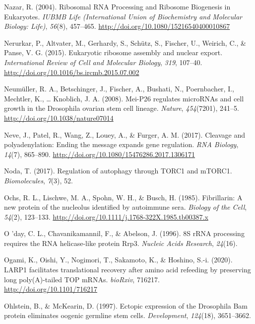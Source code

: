 \documentclass[12pt,twoside]{reedthesis}
\newlength{\cslhangindent}
\newenvironment{cslreferences}%
  {\setlength{\parindent}{0pt}%
  \everypar{\setlength{\hangindent}{\cslhangindent}}\ignorespaces}%
  {\par}
\begin{document}
\begin{cslreferences}
\leavevmode\hypertarget{ref-Nazar2004a}{}%
Nazar, R. (2004). Ribosomal RNA Processing and Ribosome Biogenesis in Eukaryotes. \emph{IUBMB Life (International Union of Biochemistry and Molecular Biology: Life)}, \emph{56}(8), 457--465. \url{http://doi.org/10.1080/15216540400010867}

\leavevmode\hypertarget{ref-nerurkarEukaryoticRibosomeAssembly2015}{}%
Nerurkar, P., Altvater, M., Gerhardy, S., Schütz, S., Fischer, U., Weirich, C., \& Panse, V. G. (2015). Eukaryotic ribosome assembly and nuclear export. \emph{International Review of Cell and Molecular Biology}, \emph{319}, 107--40. \url{http://doi.org/10.1016/bs.ircmb.2015.07.002}

\leavevmode\hypertarget{ref-Neumuller2008}{}%
Neumüller, R. A., Betschinger, J., Fischer, A., Bushati, N., Poernbacher, I., Mechtler, K., \ldots{} Knoblich, J. A. (2008). Mei-P26 regulates microRNAs and cell growth in the Drosophila ovarian stem cell lineage. \emph{Nature}, \emph{454}(7201), 241--5. \url{http://doi.org/10.1038/nature07014}

\leavevmode\hypertarget{ref-Neve2017i}{}%
Neve, J., Patel, R., Wang, Z., Louey, A., \& Furger, A. M. (2017). Cleavage and polyadenylation: Ending the message expands gene regulation. \emph{RNA Biology}, \emph{14}(7), 865--890. \url{http://doi.org/10.1080/15476286.2017.1306171}

\leavevmode\hypertarget{ref-Noda2017}{}%
Noda, T. (2017). Regulation of autophagy through TORC1 and mTORC1. \emph{Biomolecules}, \emph{7}(3), 52.

\leavevmode\hypertarget{ref-ochsFibrillarinNewProtein1985}{}%
Ochs, R. L., Lischwe, M. A., Spohn, W. H., \& Busch, H. (1985). Fibrillarin: A new protein of the nucleolus identified by autoimmune sera. \emph{Biology of the Cell}, \emph{54}(2), 123--133. \url{http://doi.org/10.1111/j.1768-322X.1985.tb00387.x}

\leavevmode\hypertarget{ref-oday8SRRNAProcessing1996}{}%
O 'day, C. L., Chavanikamannil, F., \& Abelson, J. (1996). 8S rRNA processing requires the RNA helicase-like protein Rrp3. \emph{Nucleic Acids Research}, \emph{24}(16).

\leavevmode\hypertarget{ref-ogamiLARP1FacilitatesTranslational2020}{}%
Ogami, K., Oishi, Y., Nogimori, T., Sakamoto, K., \& Hoshino, S.-i. (2020). LARP1 facilitates translational recovery after amino acid refeeding by preserving long poly(A)-tailed TOP mRNAs. \emph{bioRxiv}, 716217. \url{http://doi.org/10.1101/716217}

\leavevmode\hypertarget{ref-ohlsteinEctopicExpressionDrosophila1997}{}%
Ohlstein, B., \& McKearin, D. (1997). Ectopic expression of the Drosophila Bam protein eliminates oogenic germline stem cells. \emph{Development}, \emph{124}(18), 3651--3662.


\end{cslreferences}
\end{document}
